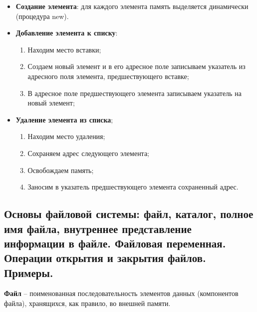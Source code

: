 \begin{itemize}
    \item {\bf Создание элемента}: для каждого элемента память выделяется динамически (процедура new).
    
    \item {\bf Добавление элемента к списку}:
    \begin{enumerate}
    \item Находим место вставки;

    \item Создаем новый элемент и в его адресное поле записываем указатель из адресного поля элемента, предшествующего вставке;

    \item В адресное поле предшествующего элемента записываем указатель на новый элемент;
    \end{enumerate}
    \item {\bf Удаление элемента из списка};
    \begin{enumerate}
        \item Находим место удаления;
        \item Сохраняем адрес следующего элемента;
        \item Освобождаем память;
        \item Заносим в указатель предшествующего элемента сохраненный адрес. 
    \end{enumerate}

\end{itemize}

\vspace*{100pt}





\newpage\subsection{Основы файловой системы: файл, каталог, полное имя файла, внутреннее представление 
информации в файле. Файловая переменная. Операции открытия и закрытия файлов. Примеры. }

\begin{myquote}
            
\end{myquote}

{\bf Файл} – поименованная  последовательность элементов данных (компонентов файла), хранящихся, как правило, во внешней памяти. 

